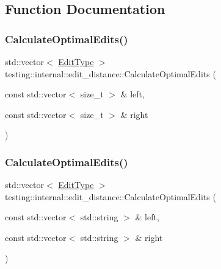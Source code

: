 \subsection{Function Documentation}
\mbox{\label{namespacetesting_1_1internal_1_1edit__distance_a26323b4c2a29ea8e187aafbd4d2275db}} 
\subsubsection{\texorpdfstring{Calculate\+Optimal\+Edits()}{CalculateOptimalEdits()}\hspace{0.1cm}{\footnotesize\ttfamily [1/2]}}
{\footnotesize\ttfamily std\+::vector$<$ \hyperlink{namespacetesting_1_1internal_1_1edit__distance_ad46aa6da12aec1a3f166310478b53a08}{Edit\+Type} $>$ testing\+::internal\+::edit\+\_\+distance\+::\+Calculate\+Optimal\+Edits (\begin{DoxyParamCaption}\item[{const std\+::vector$<$ size\+\_\+t $>$ \&}]{left,  }\item[{const std\+::vector$<$ size\+\_\+t $>$ \&}]{right }\end{DoxyParamCaption})}

\mbox{\label{namespacetesting_1_1internal_1_1edit__distance_a32267b2ae24de1de175ac8217406877d}} 
\subsubsection{\texorpdfstring{Calculate\+Optimal\+Edits()}{CalculateOptimalEdits()}\hspace{0.1cm}{\footnotesize\ttfamily [2/2]}}
{\footnotesize\ttfamily std\+::vector$<$ \hyperlink{namespacetesting_1_1internal_1_1edit__distance_ad46aa6da12aec1a3f166310478b53a08}{Edit\+Type} $>$ testing\+::internal\+::edit\+\_\+distance\+::\+Calculate\+Optimal\+Edits (\begin{DoxyParamCaption}\item[{const std\+::vector$<$ std\+::string $>$ \&}]{left,  }\item[{const std\+::vector$<$ std\+::string $>$ \&}]{right }\end{DoxyParamCaption})}

